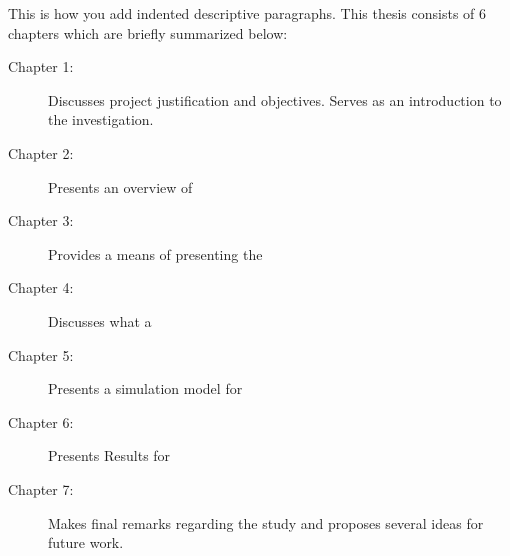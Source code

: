 \noindent
This is how you add indented descriptive paragraphs. This thesis consists of 6 chapters which are briefly summarized below:
\begin{description}
\item [Chapter 1:] Discusses project justification and objectives. Serves as an introduction to the investigation. \lipsum[1][5-7]
\item [Chapter 2:] Presents an overview of \lipsum[1][5-7]
\item [Chapter 3:] Provides a means of presenting the \lipsum[1][5-7]
\item [Chapter 4:] Discusses what a \lipsum[1][5-7]
\item [Chapter 5:] Presents a simulation model for \lipsum[1][5-7]
\item [Chapter 6:] Presents Results for \lipsum[1][5-7]
\item [Chapter 7:] Makes final remarks regarding the study and proposes several ideas for future work.
\end{description}


